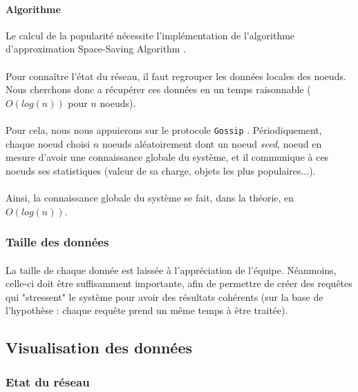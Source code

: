 \documentclass[12pt]{article}
\begin{document}
\paragraph{Algorithme} Le calcul de la popularité nécessite l'implémentation de l'algorithme d'approximation Space-Saving Algorithm \cite{SpaceSaving}.

\paragraph{}Pour connaître l'état du réseau, il faut regrouper les données locales des noeuds.
Nous cherchons donc a récupérer ces données en un temps raisonnable ($O(log(n))$ pour $n$ noeuds).

\paragraph{}Pour cela, nous nous appuierons sur le protocole \texttt{Gossip} \cite{gossip}.
Périodiquement, chaque noeud choisi $n$ noeuds aléatoirement dont un noeud \textit{seed}, noeud en mesure d'avoir une connaissance globale du système, et il communique à ces noeuds ses statistiques (valeur de sa charge, objets les plus populaires...).

\paragraph{}Ainsi, la connaissance globale du système se fait, dans la théorie, en $O(log(n))$.


\subsubsection{Taille des données}

\paragraph{} La taille de chaque donnée est laissée à l'appréciation de l'équipe. Néanmoins, celle-ci doit être suffisamment importante, afin de permettre de créer des requêtes qui "stressent" le système pour avoir des résultats cohérents (sur la base de l'hypothèse : chaque requête prend un même temps à être traitée).


\subsection{Visualisation des données}

\subsubsection{Etat du réseau}
\end{document}
